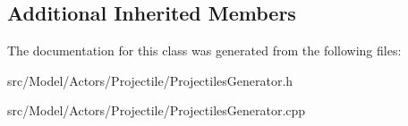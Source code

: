 \subsection*{Additional Inherited Members}


The documentation for this class was generated from the following files\+:\begin{DoxyCompactItemize}
\item 
src/\+Model/\+Actors/\+Projectile/Projectiles\+Generator.\+h\item 
src/\+Model/\+Actors/\+Projectile/Projectiles\+Generator.\+cpp\end{DoxyCompactItemize}
